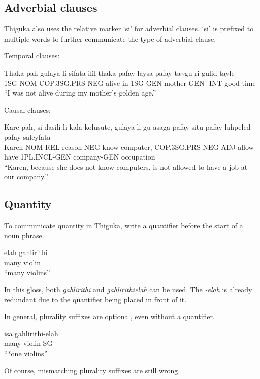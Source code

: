 \subsection{Adverbial clauses}
Thiguka also uses the relative marker `si' for adverbial clauses. `si' is prefixed to
multiple words to further communicate the type of adverbial clause.

Temporal clauses:
\begin{exe}
    \ex{} \gll{}Thaka-pah gulaya      li-sifata ifil thaka-pafay laysa-pafay ta\~{}gu-ri-gulid  tayle\\
                1SG-NOM   COP.3SG.PRS NEG-alive in   1SG-GEN     mother-GEN  \agradj{}-INT-good time\\
          \glt{}``I was not alive during my mother's golden age.''
\end{exe}

Causal clauses:
\begin{exe}
    \ex{} \gll{}Kare-pah, si-dasili  li-kala  kolusute, gulaya      li-gu-asaga   pafay situ-pafay   lahpeled-pafay saleyfata\\
    Karen-NOM REL-reason NEG-know computer, COP.3SG.PRS NEG-ADJ-allow have  1PL.INCL-GEN company-GEN    occupation\\
    \glt{}``Karen, because she does not know computers, is not allowed to have a job at our company.''
\end{exe}
\subsection{Quantity}
To communicate quantity in Thiguka, write a quantifier before the start of a noun phrase.

\begin{exe}
    \ex{} \gll{}elah gahlirithi\\
                many violin\\
          \glt{}``many violins''
\end{exe}
In this gloss, both \textit{gahlirithi} and \textit{gahlirithielah} can be used.
The \textit{-elah} is already redundant due to the quantifier being placed in front of it.

In general, plurality suffixes are optional, even without a quantifier.

\begin{exe}
    \ex{} \gll{}isa  gahlirithi-elah\\
                many violin-SG\\
          \glt{}``*one violins''
\end{exe}
Of course, mismatching plurality suffixes are still wrong.
